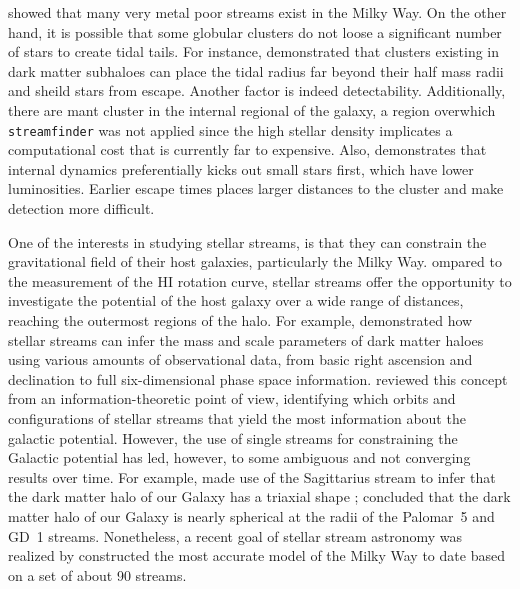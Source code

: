 \documentclass[draft]{aa}
\begin{document}
  \citet{2022MNRAS.516.5331M} showed that many very metal poor streams exist in the Milky Way. On the other hand, it is possible that some globular clusters do not loose a significant number of stars to create tidal tails. For instance, \citet{2022A&A...667A.112V} demonstrated that clusters existing in dark matter subhaloes can place the tidal radius far beyond their half mass radii and sheild stars from escape. Another factor is indeed detectability. Additionally, there are mant cluster in the internal regional of the galaxy, a region overwhich \texttt{streamfinder} was not applied since the high stellar density implicates a computational cost that is currently far to expensive. Also, \citet{2018MNRAS.474.2479B} demonstrates that internal dynamics preferentially kicks out small stars first, which have lower luminosities. Earlier escape times places larger distances to the cluster and make detection more difficult. 
  
  
  One of the interests in studying stellar streams, is that they can constrain the gravitational field of their host galaxies, particularly the Milky Way. ompared to the measurement of the HI rotation curve, stellar streams offer the opportunity to investigate the potential of the host galaxy over a wide range of distances, reaching the outermost regions of the halo. For example, \citet{2011MNRAS.417..198V} demonstrated how stellar streams can infer the mass and scale parameters of dark matter haloes using various amounts of observational data, from basic right ascension and declination to full six-dimensional phase space information. \citet{2018ApJ...867..101B} reviewed this concept from an information-theoretic point of view, identifying which orbits and configurations of stellar streams that yield the most information about the galactic potential. However, the use of single streams for constraining the Galactic potential has led, however, to some ambiguous and not converging results over time. For example, \citet{2010ApJ...718.1128L} made use of the Sagittarius stream to infer that the dark matter halo of our Galaxy has a triaxial shape \citep[but see also][]{2004MNRAS.351..643H, johnston05, 2005ApJ...619..807L}; \citet{2016ApJ...833...31B} concluded that the dark matter halo of our Galaxy is nearly spherical at the radii of the Palomar~5 and GD~1 streams. Nonetheless, a recent goal of stellar stream astronomy was realized by \citet{2024ApJ...967...89I} constructed the most accurate model of the Milky Way to date based on a set of about 90 streams. 
\end{document}
